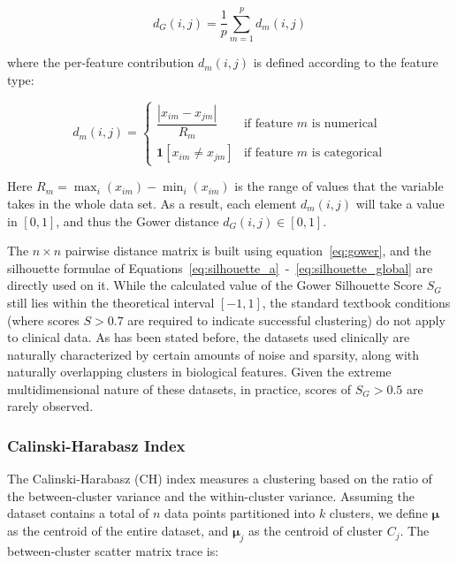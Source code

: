 \begin{equation}
    d_G(i, j) = \frac{1}{p} \sum_{m=1}^{p} d_m(i, j)
    \label{eq:gower}
\end{equation}

where the per-feature contribution $d_m(i, j)$ is defined according to the feature type:

\begin{equation}
    d_m(i, j) =
    \begin{cases}
        \dfrac{|x_{im} - x_{jm}|}{R_m} & \text{if feature } m \text{ is numerical} \\[8pt]
        \mathbf{1}[x_{im} \neq x_{jm}]  & \text{if feature } m \text{ is categorical}
    \end{cases}
    \label{eq:gower_dm}
\end{equation}

Here $R_m=\max_i(x_{im})-\min_i(x_{im})$ is the range of values that the variable takes in the whole data set. As a result, each element $d_m(i,j)$ will take a value in $[0,1]$, and thus the Gower distance $d_G(i,j)\in[0,1]$.

The $n\times n$ pairwise distance matrix is built using equation~\eqref{eq:gower}, and the silhouette formulae of Equations~\eqref{eq:silhouette_a}~-~\eqref{eq:silhouette_global} are directly used on it. While the calculated value of the Gower Silhouette Score $S_G$ still lies within the theoretical interval $[-1, 1]$, the standard textbook conditions (where scores $S > 0.7$ are required to indicate successful clustering) do not apply to clinical data. As has been stated before, the datasets used clinically are naturally characterized by certain amounts of noise and sparsity, along with naturally overlapping clusters in biological features. Given the extreme multidimensional nature of these datasets, in practice, scores of $S_G > 0.5$ are rarely observed.

\subsubsection*{Calinski-Harabasz Index}

The Calinski-Harabasz (CH) index \cite{calinski1974} measures a clustering based on the ratio of the between-cluster variance and the within-cluster variance. Assuming the dataset contains a total of $n$ data points partitioned into $k$ clusters, we define $\boldsymbol{\mu}$ as the centroid of the entire dataset, and $\boldsymbol{\mu}_j$ as the centroid of cluster $C_j$. The between-cluster scatter matrix trace is:

